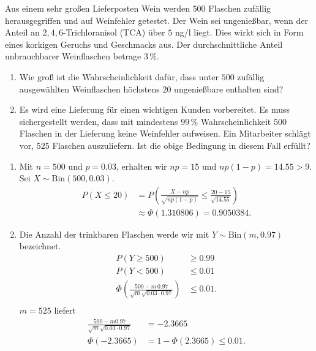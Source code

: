  Aus einem sehr großen Lieferposten
Wein werden $500$ Flaschen zufällig herausgegriffen und auf Weinfehler
getestet. Der Wein sei ungenießbar, wenn der Anteil an $2,4,6$-Trichloranisol
(TCA) über $5$ ng/l liegt. Dies wirkt sich in Form eines korkigen Geruchs und
Geschmacks aus. Der durchschnittliche Anteil unbrauchbarer Weinflaschen betrage
$3\,\%$. 
\begin{enumerate}
    \item Wie groß ist die Wahrscheinlichkeit dafür, dass unter $500$ zufällig 
        ausgewählten Weinflaschen höchstens $20$ ungenießbare enthalten sind? 
    \item Es wird eine Lieferung für einen wichtigen Kunden vorbereitet. Es
        muss sichergestellt werden, dass mit mindestens $99\,\%$
        Wahrscheinlichkeit $500$ Flaschen in der Lieferung keine Weinfehler
        aufweisen. Ein Mitarbeiter schlägt vor, $525$ Flaschen auszuliefern.
        Ist die obige Bedingung in diesem Fall erfüllt?
        
\end{enumerate}

\solution 
\begin{enumerate}
    \item Mit $n=500$ und $p=0.03$, erhalten wir $np = 15$ und $np(1-p) = 14.55 > 9$.
        Sei $X \sim \text{Bin}(500,0.03)$.
        \begin{align*}
            P\left( X \leq 20 \right) &= 
                P \left( \frac{ X - np}{ \sqrt{np(1-p)} } \leq \frac{20 - 15}{ \sqrt{14.55}} \right) \\
                &\approx \Phi\left( 1.310806 \right) = 0.9050384. 
        \end{align*}

    \item Die Anzahl der trinkbaren Flaschen werde wir mit $Y \sim
        \text{Bin}(m, 0.97)$ bezeichnet. 
        \begin{align*}
            P\left( Y \geq 500 \right) & \geq 0.99 \\
            P\left( Y<500 \right) & \leq 0.01 \\
            \Phi\left( \frac{500 - m\, 0.97}{\sqrt{m}\sqrt{0.03\cdot 0.97}} \right) & \leq 0.01. \\
        \end{align*}
        $m=525$ liefert
        \begin{align*}
            \frac{500 - m 0.97}{\sqrt{m}\sqrt{0.03\cdot 0.97}} &= -2.3665 \\
            \Phi(-2.3665) &= 1 - \Phi( 2.3665 ) \leq 0.01.
        \end{align*}
\end{enumerate}



